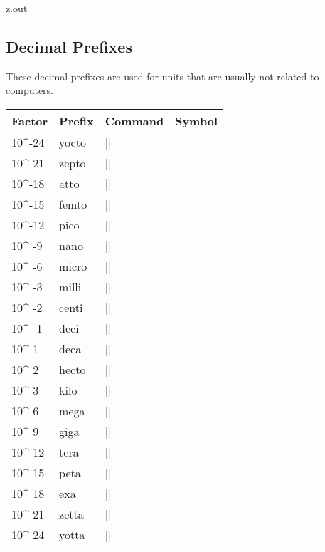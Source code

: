 \begin{VerbatimOut}{z.out}

\subsection{Decimal Prefixes}

These decimal prefixes are used for units that are usually not
related to computers.

\begin{inlinetable}
  \begin{tabular}{@{}mlll@{}}
    \toprule
    \textbf{Factor}& \textbf{Prefix}& \textbf{Command}& \textbf{Symbol}\\
    \midrule
    10^{-24}& yocto& |\yocto|& \unit{\yocto\nounit}\\
    10^{-21}& zepto& |\zepto|& \unit{\zepto\nounit}\\
    10^{-18}& atto&  |\atto|&  \unit{\atto\nounit}\\
    10^{-15}& femto& |\femto|& \unit{\femto\nounit}\\
    10^{-12}& pico&  |\pico|&  \unit{\pico\nounit}\\
    10^{ -9}& nano&  |\nano|&  \unit{\nano\nounit}\\
    10^{ -6}& micro& |\micro|& \unit{\micro\nounit}\\
    10^{ -3}& milli& |\milli|& \unit{\milli\nounit}\\
    10^{ -2}& centi& |\centi|& \unit{\centi\nounit}\\
    10^{ -1}& deci&  |\deci|&  \unit{\deci\nounit}\\
    10^{  1}& deca&  |\deca|&  \unit{\deca\nounit}\\   %
    10^{  2}& hecto& |\hecto|& \unit{\hecto\nounit}\\
    10^{  3}& kilo&  |\kilo|&  \unit{\kilo\nounit}\\
    10^{  6}& mega&  |\mega|&  \unit{\mega\nounit}\\
    10^{  9}& giga&  |\giga|&  \unit{\giga\nounit}\\
    10^{ 12}& tera&  |\tera|&  \unit{\tera\nounit}\\
    10^{ 15}& peta&  |\peta|&  \unit{\peta\nounit}\\
    10^{ 18}& exa&   |\exa|&   \unit{\exa\nounit}\\
    10^{ 21}& zetta& |\zetta|& \unit{\zetta\nounit}\\
    10^{ 24}& yotta& |\yotta|& \unit{\yotta\nounit}\\
    \bottomrule
  \end{tabular}
\end{inlinetable}
\end{VerbatimOut}

